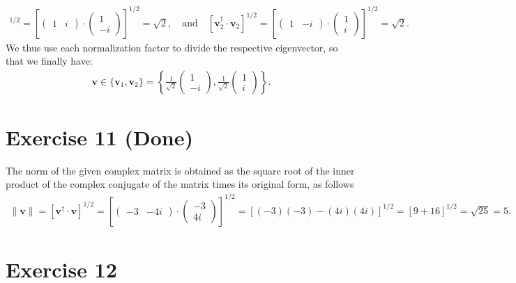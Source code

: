 \documentclass[letterpaper,11pt,twoside]{article}
\begin{document}
\begin{align*}
  [\bm{v}_1^\dagger\cdot\bm{v}_1]^{1/2}=\left[\begin{pmatrix}
    1&i
  \end{pmatrix}\cdot\begin{pmatrix}
    1\\-i
  \end{pmatrix}\right]^{1/2}=\sqrt{2},\quad\text{and}\quad
  [\bm{v}_2^\dagger\cdot\bm{v}_2]^{1/2}=\left[\begin{pmatrix}
    1&-i
  \end{pmatrix}\cdot\begin{pmatrix}
    1\\i
  \end{pmatrix}\right]^{1/2}=\sqrt{2}.
\end{align*}
We thus use each normalization factor to divide the respective eigenvector, so that we finally have:
\begin{align*}
  \bm{v}\in\{\bm{v}_1,\bm{v}_2\}=\left\{\frac{1}{\sqrt{2}}\begin{pmatrix}
  1\\-i\end{pmatrix},\frac{1}{\sqrt{2}}\begin{pmatrix}
  1\\i\end{pmatrix}\right\}.
\end{align*}

\section{Exercise 11 (Done)} 
The norm of the given complex matrix is obtained as the square root of the inner product of the complex conjugate of the matrix times its
original form, as follows
\begin{align*}
  \|\bm{v}\|=[\bm{v}^\dagger\cdot\bm{v}]^{1/2}=\left[
    \begin{pmatrix}
      -3&-4i
    \end{pmatrix}\cdot\begin{pmatrix}
      -3\\4i
    \end{pmatrix}
  \right]^{1/2}=[(-3)(-3)-(4i)(4i)]^{1/2}=[9+16]^{1/2}=\sqrt{25}=5.
\end{align*}



\section{Exercise 12}
\end{document}
